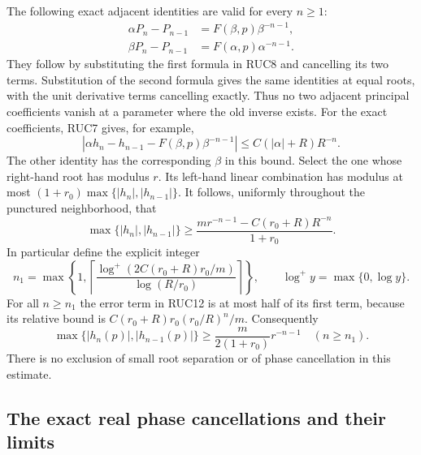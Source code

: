 The following exact adjacent identities are valid for every $n\ge1$:
\[
 \begin{aligned}
 \alpha P_n-P_{n-1}&=F(\beta,p)\beta^{-n-1},\\
 \beta P_n-P_{n-1}&=F(\alpha,p)\alpha^{-n-1}.
 \end{aligned}\tag{RUC10}
\]
They follow by substituting the first formula in RUC8 and
cancelling its two terms.  Substitution of the second formula
gives the same identities at equal roots, with the unit derivative
terms cancelling exactly.  Thus no two adjacent principal
coefficients vanish at a parameter where the old inverse exists.
For the exact coefficients, RUC7 gives, for example,
\[
 |\alpha h_n-h_{n-1}-F(\beta,p)\beta^{-n-1}|
       \le C(|\alpha|+R)R^{-n}.
 \tag{RUC11}
\]
The other identity has the corresponding $\beta$ in this bound.
Select the one whose right-hand root has modulus $r$.
Its left-hand linear combination has modulus at most
$(1+r_0)\max\{|h_n|,|h_{n-1}|\}$.
It follows, uniformly throughout the punctured neighborhood, that
\[
 \max\{|h_n|,|h_{n-1}|\}
 \ge\frac{m r^{-n-1}-C(r_0+R)R^{-n}}{1+r_0}.
 \tag{RUC12}
\]
In particular define the explicit integer
\[
 n_1=\max\left\{1,
  \left\lceil\frac{\log^+(2C(r_0+R)r_0/m)}{\log(R/r_0)}\right\rceil
              \right\},\qquad \log^+y=\max\{0,\log y\}.
\]
For all $n\ge n_1$ the error term in RUC12 is at most half of
its first term, because its relative bound is
$C(r_0+R)r_0(r_0/R)^n/m$.  Consequently
\[
 \max\{|h_n(p)|,|h_{n-1}(p)|\}
       \ge\frac{m}{2(1+r_0)}r^{-n-1}\quad(n\ge n_1).
 \tag{RUC13}
\]
There is no exclusion of small root separation or of phase
cancellation in this estimate.

\subsection{The exact real phase cancellations and their limits}

